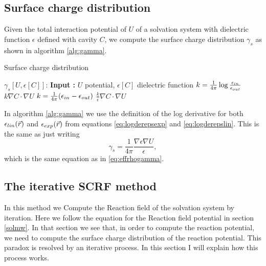 \documentclass[..Thesis.tex]{subfiles}
\begin{document}
\subsection{Surface charge distribution}
Given the total interaction potential of $U$ of a solvation system with
dielectric function $\epsilon$ defined with cavity $C$, we compute the surface charge distribution
$\gamma_s$ as shown in algorithm \ref{alg:gamma}.
\begin{algorithm}
  \caption{Surface charge distribution}\label{alg:gamma}
  \begin{algorithmic}
    \STATE $\gamma_s[U, \epsilon[C]]$:
    \STATE \textbf{Input :} $U$ potential, $\epsilon[C]$ dielectric function
      \STATE $k = \frac{1}{4\pi}\log\frac{\epsilon_{in}}{\epsilon_{out}}$
      \RETURN $k \nabla C \cdot \nabla U$
      \STATE $k = \frac{1}{4\pi}(\epsilon_{in}-\epsilon_{out})$
      \RETURN $\frac{k}{\epsilon} \nabla C \cdot \nabla U$
    \ENDIF
  \end{algorithmic}
\end{algorithm}

In algorithm \ref{alg:gamma} we use the definition of the log derivative for both $\epsilon_{lin}(\vec{r})$ and $\epsilon_{exp}(\vec{r})$
from equations \ref{eq:logderepsexp} and \ref{eq:logderepslin}. This is the same
as just writing $$\gamma_s = \frac{1}{4\pi}\frac{\nabla\epsilon\nabla U}{\epsilon},$$
which is the same equation as in \ref{eq:effrhogamma}.

\subsection{The iterative \ac{SCRF} method}
In this method we Compute the Reaction field of the solvation system by iteration.
Here we follow the equation for the Reaction field potential in section \ref{solmw}.
In that section we see that, in order to compute the reaction potential, we need
to compute the surface charge distribution of the reaction potential. This
paradox is resolved by an iterative process. In this section I will explain how
this process works.
\end{document}
